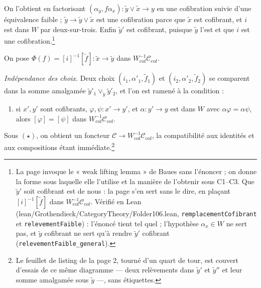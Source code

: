 \documentclass[11pt,a4paper]{article}
\begin{document}

On l'obtient en factorisant $(\alpha_{y}, f\alpha_{x}) : \widetilde{y} \vee
\widetilde{x} \to y$ en une cofibration suivie d'une équivalence faible ;
$\widetilde{y} \to \widetilde{y} \vee \widetilde{x}$ est une cofibration parce
que $\widetilde{x}$ est cofibrant, et $i$ est dans $W$ par
deux-sur-trois. Enfin $\widetilde{y}'$ est cofibrant, puisque $\widetilde{y}$
l'est et que $i$ est une cofibration.\footnote{La page invoque le « weak
lifting lemma » de Baues sans l'énoncer ; on donne la forme sous laquelle
elle l'utilise et la manière de l'obtenir sous C1--C3. Que $\widetilde{y}'$
soit cofibrant est de nous : la page s'en sert sans le dire, en plaçant
$[i]^{-1}[\widetilde{f}]$ dans $W_{\mathrm{cof}}^{-1}\mathcal{C}_{\mathrm{cof}}$.
Vérifié en Lean (lean/Grothendieck/CategoryTheory/Folder106.lean, \texttt{remplacementCofibrant}
et \texttt{relevementFaible}) : l'énoncé tient tel quel ; l'hypothèse
$\alpha_{x} \in W$ ne sert pas, et $\widetilde{y}$ cofibrant ne sert qu'à
rendre $\widetilde{y}'$ cofibrant (\texttt{relevementFaible\_general}).}

On pose $\Phi(f) = [i]^{-1}[\widetilde{f}] : \widetilde{x} \to \widetilde{y}$
dans $W_{\mathrm{cof}}^{-1}\mathcal{C}_{\mathrm{cof}}$.

\emph{Indépendance des choix.} Deux choix $(i_{1}, \alpha'_{1},
\widetilde{f}_{1})$ et $(i_{2}, \alpha'_{2}, \widetilde{f}_{2})$ se comparent
dans la somme amalgamée $\widetilde{y}'_{1} \vee_{\widetilde{y}}
\widetilde{y}'_{2}$, et l'on est ramené à la condition :

\begin{enumerate}
\item[$(\star)$] si $x', y'$ sont cofibrants, $\varphi, \psi : x' \to y'$, et
$\alpha : y' \to y$ est dans $W$ avec $\alpha\varphi = \alpha\psi$, alors
$[\varphi] = [\psi]$ dans $W_{\mathrm{cof}}^{-1}\mathcal{C}_{\mathrm{cof}}$.
\end{enumerate}

Sous $(\star)$, on obtient un foncteur $\mathcal{C} \to
W_{\mathrm{cof}}^{-1}\mathcal{C}_{\mathrm{cof}}$, la compatibilité aux
identités et aux compositions étant immédiate.\footnote{Le feuillet de listing
de la page 2, tourné d'un quart de tour, est couvert d'essais de ce même
diagramme --- deux relèvements dans $\widetilde{y}'$ et $\widetilde{y}''$ et leur
somme amalgamée sous $\widetilde{y}$ ---, sans étiquettes.}
\end{document}
